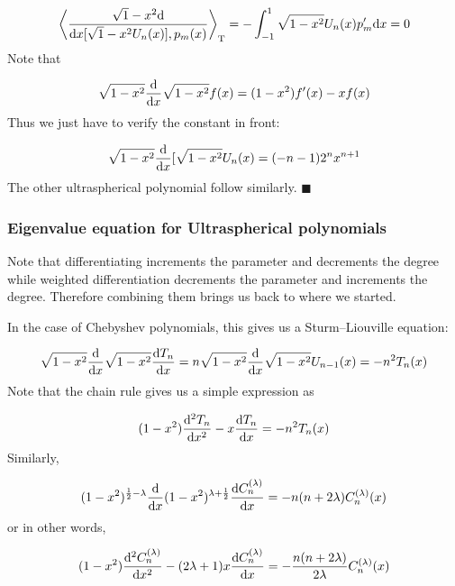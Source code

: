\documentclass[12pt,a4paper]{article}
\def\half{ {1 \over 2} }
\def\D{ {\rm d} }
\def\ip<#1>{\left\langle{#1}\right\rangle}
\def\dx{\D x}
\def\endash{–}
\begin{document}
\[
\ip< \sqrt{1-x^2} {\D \over \dx }[\sqrt{1-x^2} U_n(x)], p_m(x)>_{\rm T} = -\int_{-1}^1 \sqrt{1-x^2} U_n(x) p_m' \dx =0
\]
Note that

\[
\sqrt{1-x^2} {\D \over \dx } \sqrt{1-x^2} f(x) = (1-x^2) f'(x) - x f(x)
\]
Thus we just have to verify the constant in front:

\[
\sqrt{1-x^2} {\D \over \dx }[\sqrt{1-x^2} U_n(x) = (-n -1) 2^n x^{n+1}
\]
The other ultraspherical polynomial follow similarly. \ensuremath{\blacksquare}

\subsubsection{Eigenvalue equation for Ultraspherical polynomials}
Note that differentiating increments the parameter and decrements the degree while weighted differentiation decrements the parameter and increments the degree. Therefore combining them brings us back to where we started.

In the case of Chebyshev polynomials, this gives us a Sturm\ensuremath{\endash}Liouville equation:

\[
\sqrt{1-x^2} {\D \over \dx} \sqrt{1-x^2} {\D T_n \over \dx} =
n \sqrt{1-x^2} {\D \over \dx} \sqrt{1-x^2} U_{n-1}(x) = -n^2 T_n(x)
\]
Note that the chain rule gives us a simple expression as

\[
(1-x^2) {\D^2 T_n \over \dx^2} -x {\D T_n \over \dx} = -n^2 T_n(x)
\]
Similarly,

\[
(1-x^2)^{\half - \lambda} {\D \over \dx}(1-x^2)^{\lambda + \half} {\D C_n^{(\lambda)} \over \dx} = -n (n+2 \lambda) C_n^{(\lambda)}(x)
\]
or in other words,

\[
(1-x^2) {\D^2 C_n^{(\lambda)} \over \dx^2} - (2\lambda+1) x {\D C_n^{(\lambda)} \over \dx}  = -{n (n+2 \lambda) \over 2\lambda}C_n^{(\lambda)}(x)
\]
\end{document}
